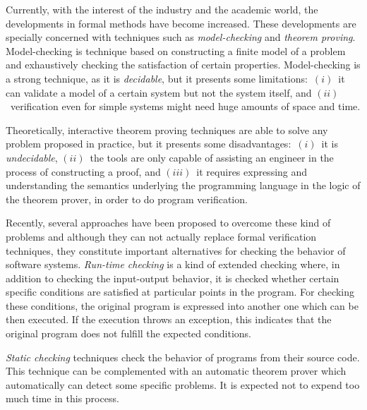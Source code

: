 \documentclass[a4paper]{llncs}
\begin{document}
Currently, with the interest of the industry and the academic world,
the developments in formal methods have become
increased. These developments are specially concerned with techniques
such as
\textit{model-checking} and \textit{theorem proving}.
Model-checking is technique based on constructing a finite model of a
problem and exhaustively checking the satisfaction of certain
properties. Model-checking is
a strong technique, as it is \emph{decidable}, but it presents some
limitations$:$ $(i)$~it can validate a
model of a certain system but not the system itself, and
$(ii)$~verification even for simple systems might need huge amounts
of space and time. 

Theoretically, interactive theorem proving techniques are able to
solve any problem proposed in practice, but it presents some
disadvantages$:$ $(i)$~it is \emph{undecidable}, $(ii)$~the tools are
only capable of assisting an engineer in the process of constructing a
proof, and $(iii)$~it requires expressing and understanding the
semantics underlying the
programming language in the logic of the theorem prover, in order to
do program verification. 

Recently, several approaches have been
proposed to overcome these kind of problems and although they can not
actually replace formal verification techniques, they constitute
important alternatives for checking the behavior of software
systems. \emph{Run-time
checking} is a kind of extended checking where, in addition to checking
the input-output behavior, it is checked whether certain specific
conditions are
satisfied at particular points in the program. For checking these
conditions, the original program is expressed into another
one
which can be then executed. If the execution throws an exception,
this indicates that the original program does not fulfill the
expected conditions.

\emph{Static checking} techniques check the behavior of programs
from their source code. This technique can be complemented with
an automatic theorem prover which automatically can detect
some specific problems. It is expected not to expend too much time in
this process.
\end{document}
